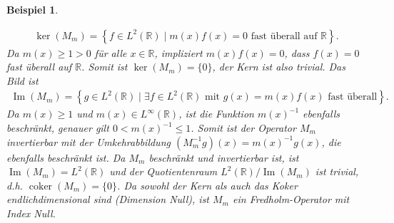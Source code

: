 \documentclass[11pt, hidelinks]{article}
\numberwithin{conj}{section}
\newtheorem{example}[conj]{Beispiel}
\begin{document}
\begin{example}
\begin{enumerate}
        \begin{align}
        \ker(M_m) = \left\{ f \in L^2(\mathbb{R}) \mid m(x) f(x) = 0 \text{ fast überall auf } \mathbb{R} \right\}.
        \end{align}
        Da \( m(x) \geq 1 > 0 \) für alle \( x \in \mathbb{R} \), impliziert \( m(x) f(x) = 0 \), dass \( f(x) = 0 \) fast überall auf \( \mathbb{R} \). Somit ist $\ker(M_m) = \{0\}$, der Kern ist also trivial. Das Bild ist
        \begin{align}
            \operatorname{Im}(M_m) = \left\{ g \in L^2(\mathbb{R}) \mid \exists f \in L^2(\mathbb{R}) \text{ mit } g(x) = m(x) f(x) \text{ fast überall} \right\}.
        \end{align}
        Da \( m(x) \geq 1 \) und \( m(x) \in L^\infty(\mathbb{R}) \), ist die Funktion \( m(x)^{-1} \) ebenfalls beschränkt, genauer gilt \( 0 < m(x)^{-1} \leq 1 \). Somit ist der Operator \( M_m \) invertierbar mit der Umkehrabbildung $(M_m^{-1} g)(x) = m(x)^{-1} g(x)$, die ebenfalls beschränkt ist. Da \( M_m \) beschränkt und invertierbar ist, ist \( \operatorname{Im}(M_m) = L^2(\mathbb{R}) \) und der Quotientenraum \( L^2(\mathbb{R}) / \operatorname{Im}(M_m) \) ist trivial, d.h. $\operatorname{coker}(M_m) = \{0\}$. Da sowohl der Kern als auch das Koker endlichdimensional sind (Dimension Null), ist \( M_m \) ein Fredholm-Operator mit Index Null.
    \end{enumerate}
\end{example}
\end{document}
